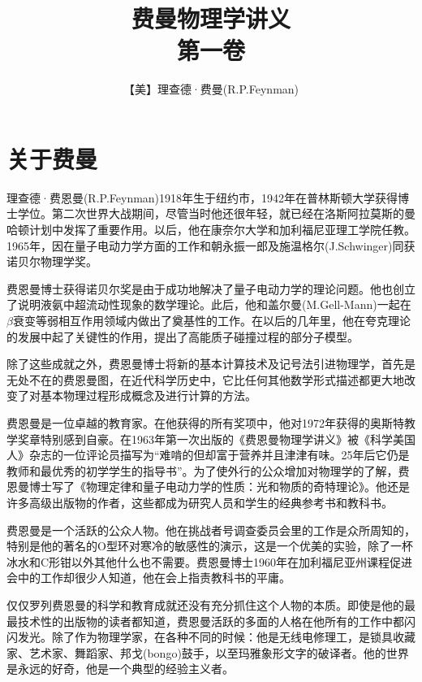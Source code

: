 \documentclass[UTF8, 12pt, a4paper, twoside]{ctexbook}
\title{\fontsize{30pt}{40pt}\selectfont \textbf{费曼物理学讲义 \\ 第一卷}}
\author{\fontsize{16pt}{20pt}\selectfont 【美】理查德·费曼(R.P.Feynman)}
\date{}
\begin{document}
\maketitle
\newpage

\thispagestyle{empty}

\chapter*{关于费曼}

\setcounter{page}{1}

理查德·费恩曼(R.P.Feynman)1918年生于纽约市，1942年在普林斯顿大学获得博士学位。第二次世界大战期间，尽管当时他还很年轻，就已经在洛斯阿拉莫斯的曼哈顿计划中发挥了重要作用。以后，他在康奈尔大学和加利福尼亚理工学院任教。1965年，因在量子电动力学方面的工作和朝永振一郎及施温格尔(J.Schwinger)同获诺贝尔物理学奖。

费恩曼博士获得诺贝尔奖是由于成功地解决了量子电动力学的理论问题。他也创立了说明液氨中超流动性现象的数学理论。此后，他和盖尔曼(M.Gell-Mann)一起在$\beta$衰变等弱相互作用领域内做出了奠基性的工作。在以后的几年里，他在夸克理论的发展中起了关键性的作用，提出了高能质子碰撞过程的部分子模型。

除了这些成就之外，费恩曼博士将新的基本计算技术及记号法引进物理学，首先是无处不在的费恩曼图，在近代科学历史中，它比任何其他数学形式描述都更大地改变了对基本物理过程形成概念及进行计算的方法。

费恩曼是一位卓越的教育家。在他获得的所有奖项中，他对1972年获得的奥斯特教学奖章特别感到自豪。在1963年第一次出版的《费恩曼物理学讲义》被《科学美国人》杂志的一位评论员描写为“难啃的但却富于营养并且津津有味。25年后它仍是教师和最优秀的初学学生的指导书”。为了使外行的公众增加对物理学的了解，费恩曼博士写了《物理定律和量子电动力学的性质：光和物质的奇特理论》。他还是许多高级出版物的作者，这些都成为研究人员和学生的经典参考书和教科书。

费恩曼是一个活跃的公众人物。他在挑战者号调查委员会里的工作是众所周知的，特别是他的著名的O型环对寒冷的敏感性的演示，这是一个优美的实验，除了一杯冰水和C形钳以外其他什么也不需要。费恩曼博士1960年在加利福尼亚州课程促进会中的工作却很少人知道，他在会上指责教科书的平庸。

仅仅罗列费恩曼的科学和教育成就还没有充分抓住这个人物的本质。即使是他的最最技术性的出版物的读者都知道，费恩曼活跃的多面的人格在他所有的工作中都闪闪发光。除了作为物理学家，在各种不同的时候：他是无线电修理工，是锁具收藏家、艺术家、舞蹈家、邦戈(bongo)鼓手，以至玛雅象形文字的破译者。他的世界是永远的好奇，他是一个典型的经验主义者。
\end{document}
